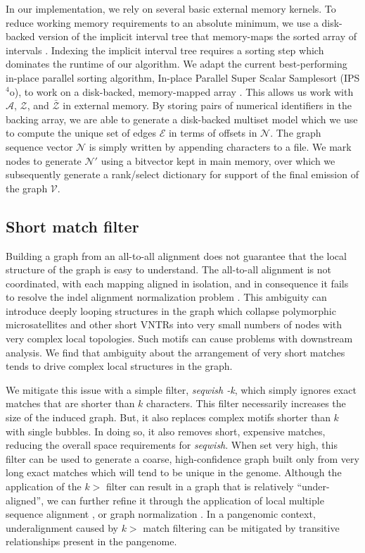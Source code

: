 \documentclass{bioinfo}
\theoremstyle{definition}
\begin{document}
In our implementation, we rely on several basic external memory kernels.
To reduce working memory requirements to an absolute minimum, we use a disk-backed version of the implicit interval tree that memory-maps the sorted array of intervals \citep{mmmulti}.
Indexing the implicit interval tree requires a sorting step which dominates the runtime of our algorithm.
We adapt the current best-performing in-place parallel sorting algorithm, In-place Parallel Super Scalar Samplesort (IPS$^4$o), to work on a disk-backed, memory-mapped array \citep{axtmann2017}.
This allows us work with $\mathcal{A}$, $\mathcal{Z}$, and $\bar{\mathcal{Z}}$ in external memory.
By storing pairs of numerical identifiers in the backing array, we are able to generate a disk-backed multiset model which we use to compute the unique set of edges $\mathcal{E}$ in terms of offsets in $\mathcal{N}$.
The graph sequence vector $\mathcal{N}$ is simply written by appending characters to a file.
We mark nodes to generate $\mathcal{N}'$ using a bitvector kept in main memory, over which we subsequently generate a rank/select dictionary \citep{Gog_2014} for support of the final emission of the graph $\mathcal{V}$.

\subsection{Short match filter}
\label{sec:filter}

Building a graph from an all-to-all alignment does not guarantee that the local structure of the graph is easy to understand.
The all-to-all alignment is not coordinated, with each mapping aligned in isolation, and in consequence it fails to resolve the indel alignment normalization problem \citep{Mose_2019}.
This ambiguity can introduce deeply looping structures in the graph which collapse polymorphic microsatellites and other short VNTRs into very small numbers of nodes with very complex local topologies.
Such motifs can cause problems with downstream analysis.
We find that ambiguity about the arrangement of very short matches tends to drive complex local structures in the graph.

We mitigate this issue with a simple filter, \textit{seqwish -k}, which simply ignores exact matches that are shorter than $k$ characters.
This filter necessarily increases the size of the induced graph.
But, it also replaces complex motifs shorter than $k$ with single bubbles.
In doing so, it also removes short, expensive matches, reducing the overall space requirements for \textit{seqwish}.
When set very high, this filter can be used to generate a coarse, high-confidence graph built only from very long exact matches which will tend to be unique in the genome.
Although the application of the $k>$ filter can result in a graph that is relatively ``under-aligned'', we can further refine it through the application of local multiple sequence alignment \citep{Gao_2020}, or graph normalization \citep{Doerr_2021}.
In a pangenomic context, underalignment caused by $k>$ match filtering can be mitigated by transitive relationships present in the pangenome.
\end{document}
